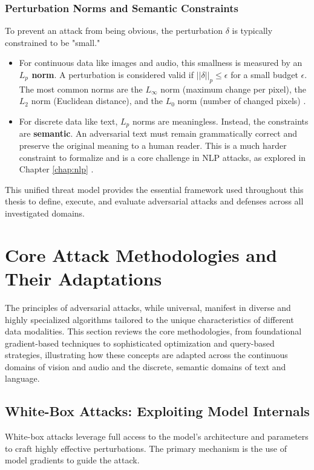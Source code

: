 \documentclass[../main.tex]{subfiles}
\begin{document}
\subsubsection{Perturbation Norms and Semantic Constraints}
To prevent an attack from being obvious, the perturbation $\delta$ is typically constrained to be "small."
\begin{itemize}
    \item For continuous data like images and audio, this smallness is measured by an \textbf{$L_p$ norm}. A perturbation is considered valid if $||\delta||_p \le \epsilon$ for a small budget $\epsilon$. The most common norms are the $L_\infty$ norm (maximum change per pixel), the $L_2$ norm (Euclidean distance), and the $L_0$ norm (number of changed pixels) \cite{goodfellow2015explaining, carlini2017evaluatingrobustnessneuralnetworks, Su_2019}.
    \item For discrete data like text, $L_p$ norms are meaningless. Instead, the constraints are \textbf{semantic}. An adversarial text must remain grammatically correct and preserve the original meaning to a human reader. This is a much harder constraint to formalize and is a core challenge in NLP attacks, as explored in Chapter \ref{chap:nlp} \cite{jin2019textfooler, morris2020textattack}.
\end{itemize}

This unified threat model provides the essential framework used throughout this thesis to define, execute, and evaluate adversarial attacks and defenses across all investigated domains.

\section{Core Attack Methodologies and Their Adaptations}
\label{sec:core_methodologies}

The principles of adversarial attacks, while universal, manifest in diverse and highly specialized algorithms tailored to the unique characteristics of different data modalities. This section reviews the core methodologies, from foundational gradient-based techniques to sophisticated optimization and query-based strategies, illustrating how these concepts are adapted across the continuous domains of vision and audio and the discrete, semantic domains of text and language.

\subsection{White-Box Attacks: Exploiting Model Internals}
White-box attacks leverage full access to the model's architecture and parameters to craft highly effective perturbations. The primary mechanism is the use of model gradients to guide the attack.
\end{document}
